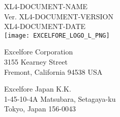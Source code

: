 \documentclass[oneside]{book}
\newcommand{\+}{\discretionary{\mbox{\scriptsize$\hookleftarrow$}}{}{}}
\newcommand{\clearemptydoublepage}{%
  \newpage{\pagestyle{empty}\cleardoublepage}%
}
\begin{document}
\renewcommand{\contentsname}{Table of Contents}
\hypersetup{pageanchor=false,
             bookmarks=true,
             bookmarksnumbered=true,
             pdfencoding=unicode
            }
\begin{titlepage}
\vspace*{7cm}
\begin{center}%
{\LARGE XL4-DOCUMENT-NAME}\\
\vspace*{1cm}
{\normalsize Ver. XL4-DOCUMENT-VERSION}\\
{\normalsize XL4-DOCUMENT-DATE}\\
\vspace*{5cm}
{\texttt{[image: EXCELFORE\_LOGO\_L\_PNG]}}\\
\vspace*{2cm}
\end{center}
\begin{multicols}{2}
\begin{center}%
{\normalsize Excelfore Corporation}\\
\vspace*{0.2cm}
{\normalsize 3155 Kearney Street}\\
\vspace*{0.2cm}
{\normalsize Fremont, California 94538 USA}\\
\end{center}
\columnbreak
\begin{center}%
{\normalsize Excelfore Japan K.K.}\\
\vspace*{0.2cm}
{\normalsize 1-45-10-4A Matsubara, Setagaya-ku}\\
\vspace*{0.2cm}
{\normalsize Tokyo, Japan 156-0043}\\
\end{center}
\end{multicols}
\end{titlepage}
\clearemptydoublepage
\tableofcontents
\begingroup
\let\clearpage\relax
\listoffigures
\listoftables
\endgroup
\clearemptydoublepage
{}
\hypersetup{pageanchor=true}

\end{document}
